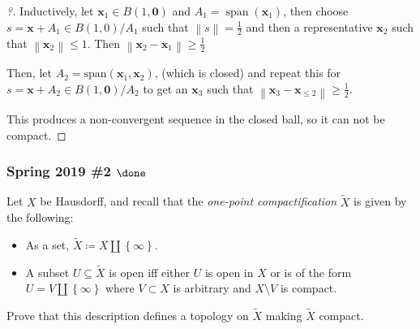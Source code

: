 \begin{concept}
\end{concept}

\begin{solution}

\envlist

\begin{proof}[?]

Inductively, let \(\mathbf{x}_1 \in B(1, \mathbf{0})\) and
\(A_1 = {\operatorname{span}}{(\mathbf{x}_1)}\), then choose
\(s = \mathbf{x} + A_1 \in B(1,0)/A_1\) such that
\({\left\lVert {s} \right\rVert} = \frac 1 2\) and then a representative
\(\mathbf{x}_2\) such that
\({\left\lVert {\mathbf{x}_2} \right\rVert} \leq 1\). Then
\({\left\lVert {\mathbf{x}_2 - \mathbf{x}_1} \right\rVert} \geq \frac 1 2\)

Then, let \(A_2 = \mathrm{span}(\mathbf{x}_1, \mathbf{x}_2)\), (which is
closed) and repeat this for
\(s = \mathbf{x} + A_2 \in B(1, \mathbf{0})/ A_2\) to get an
\(\mathbf{x}_3\) such that
\({\left\lVert {\mathbf{x}_3 - \mathbf{x}_{\leq 2}} \right\rVert} \geq \frac 1 2\).

This produces a non-convergent sequence in the closed ball, so it can
not be compact.

\end{proof}

\end{solution}

\hypertarget{spring-2019-2-done}{%
\subsubsection{\texorpdfstring{Spring 2019 \#2
\(\done\)}{Spring 2019 \#2 \textbackslash done}}\label{spring-2019-2-done}}

\begin{problem}[?]

Let \(X\) be Hausdorff, and recall that the \emph{one-point
compactification} \(\tilde X\) is given by the following:

\begin{itemize}
\item
  As a set,
  \(\tilde X \coloneqq X{\textstyle\coprod}\left\{{\infty}\right\}\).
\item
  A subset \(U\subseteq \tilde X\) is open iff either \(U\) is open in
  \(X\) or is of the form
  \(U = V{\textstyle\coprod}\left\{{\infty}\right\}\) where
  \(V\subset X\) is arbitrary and \(X\setminus V\) is compact.
\end{itemize}

Prove that this description defines a topology on \(\tilde X\) making
\(\tilde X\) compact.

\end{problem}

